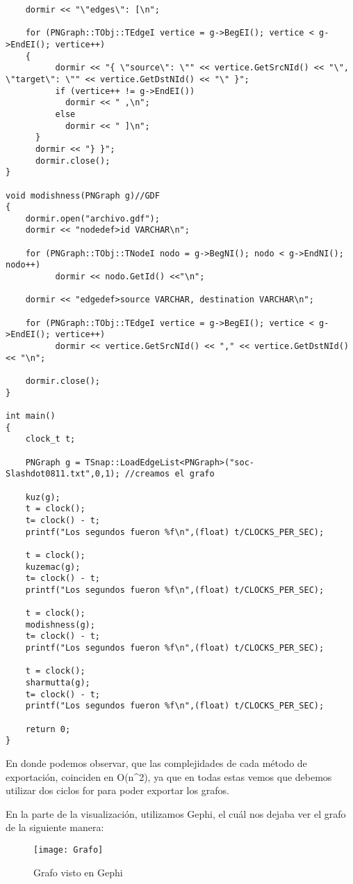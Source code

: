\documentclass[12pt]{article}
\begin{document}
\begin{lstlisting}
    dormir << "\"edges\": [\n";

    for (PNGraph::TObj::TEdgeI vertice = g->BegEI(); vertice < g->EndEI(); vertice++)
    {
          dormir << "{ \"source\": \"" << vertice.GetSrcNId() << "\", \"target\": \"" << vertice.GetDstNId() << "\" }";
          if (vertice++ != g->EndEI())
            dormir << " ,\n";
          else
            dormir << " ]\n";
      }
      dormir << "} }";
      dormir.close();
}

void modishness(PNGraph g)//GDF
{
    dormir.open("archivo.gdf");
    dormir << "nodedef>id VARCHAR\n";

    for (PNGraph::TObj::TNodeI nodo = g->BegNI(); nodo < g->EndNI(); nodo++)
          dormir << nodo.GetId() <<"\n";

    dormir << "edgedef>source VARCHAR, destination VARCHAR\n";

    for (PNGraph::TObj::TEdgeI vertice = g->BegEI(); vertice < g->EndEI(); vertice++)
          dormir << vertice.GetSrcNId() << "," << vertice.GetDstNId() << "\n";

    dormir.close();
}

int main()
{
    clock_t t;
    
    PNGraph g = TSnap::LoadEdgeList<PNGraph>("soc-Slashdot0811.txt",0,1); //creamos el grafo

    kuz(g);
    t = clock();
    t= clock() - t;
    printf("Los segundos fueron %f\n",(float) t/CLOCKS_PER_SEC);

    t = clock();
    kuzemac(g);
    t= clock() - t;
    printf("Los segundos fueron %f\n",(float) t/CLOCKS_PER_SEC);

    t = clock();
    modishness(g);
    t= clock() - t;
    printf("Los segundos fueron %f\n",(float) t/CLOCKS_PER_SEC);

    t = clock();
    sharmutta(g);
    t= clock() - t;
    printf("Los segundos fueron %f\n",(float) t/CLOCKS_PER_SEC);

    return 0;
}
\end{lstlisting}

En donde podemos observar, que las complejidades de cada método de exportación, coinciden en O(n^2), ya que en todas estas vemos que debemos utilizar dos ciclos for para poder exportar los grafos.

En la parte de la visualización, utilizamos Gephi, el cuál nos dejaba ver el grafo de la siguiente manera:

\begin{figure}[!htb] %
\texttt{[image: Grafo]}
\caption{Grafo visto en Gephi}
\label{Figure:Graphs}
\end{figure}
\end{document}
